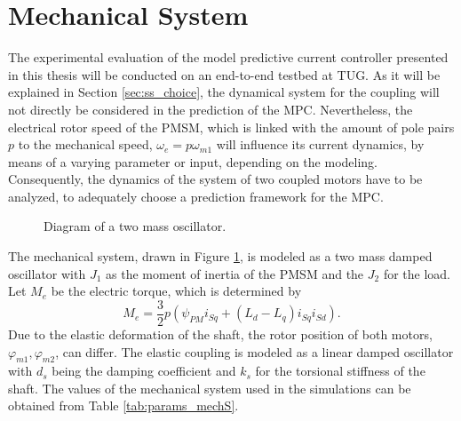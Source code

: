 \section{Mechanical System \label{sec:model_coupling}}

The experimental evaluation of the model predictive current controller presented in this thesis will be conducted on an end-to-end testbed at TUG. As it will be explained in Section \ref{sec:ss_choice}, the dynamical system for the coupling will not directly be considered in the prediction of the MPC. Nevertheless,  the  electrical rotor speed of the  PMSM, which is linked with the amount of pole pairs $p$ to the mechanical speed, $\omega_{e} = p\omega_{m1}$ will influence its current dynamics, by means of a varying parameter or input, depending on the modeling. Consequently, the dynamics of the system of two coupled motors have to be analyzed, to adequately choose a prediction framework for the MPC.
\begin{figure}[H]
	\centering
	
	\caption{Diagram of a two mass oscillator.}
	\label{fig:0_mechS}
\end{figure}

The mechanical system, drawn in Figure \ref{fig:0_mechS}, is modeled as a two mass damped oscillator with $J_1$ as the moment of inertia of the PMSM and the $J_2$ for the load. Let $M_e$ be the electric torque, which is determined by 
\begin{equation}
    M_e = \frac{3}{2} p \left(\psi_{PM} i_{Sq} + \left(L_d - L_q\right) i_{Sq}i_{Sd} \right).
    \label{equ:1_pmsm_torque}
\end{equation}
Due to the elastic deformation of the shaft, the rotor position of both motors, $\varphi_{m1}, \varphi_{m2}$, can differ. The elastic coupling is modeled as a linear damped oscillator with $d_s$ being the damping coefficient and $k_s$ for the torsional stiffness of the shaft.  The values of the mechanical system used in the simulations can be obtained from Table \ref{tab:params_mechS}.\\

